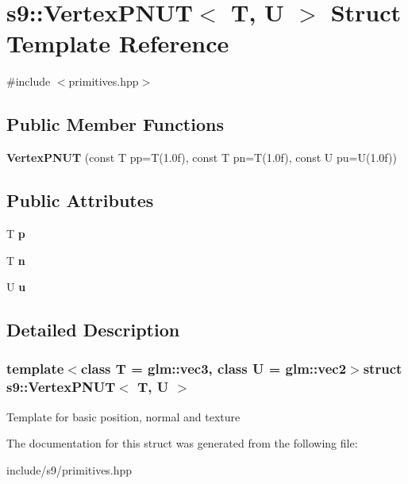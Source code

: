 \hypertarget{structs9_1_1VertexPNUT}{\section{s9\-:\-:\-Vertex\-P\-N\-U\-T$<$ \-T, \-U $>$ \-Struct \-Template \-Reference}
\label{structs9_1_1VertexPNUT}
}


{\ttfamily \#include $<$primitives.\-hpp$>$}

\subsection*{\-Public \-Member \-Functions}
\begin{DoxyCompactItemize}
\item 
\hypertarget{structs9_1_1VertexPNUT_ae31bedc31b1522090d92ffd21e715148}{{\bfseries \-Vertex\-P\-N\-U\-T} (const \-T pp=\-T(1.\-0f), const T pn=\-T(1.\-0f), const U pu=\-U(1.\-0f))}\label{structs9_1_1VertexPNUT_ae31bedc31b1522090d92ffd21e715148}

\end{DoxyCompactItemize}
\subsection*{\-Public \-Attributes}
\begin{DoxyCompactItemize}
\item 
\hypertarget{structs9_1_1VertexPNUT_a5b7dd3f6950903a2fa045047ccb213db}{\-T {\bfseries p}}\label{structs9_1_1VertexPNUT_a5b7dd3f6950903a2fa045047ccb213db}

\item 
\hypertarget{structs9_1_1VertexPNUT_a29dfcd01e62eb9f30647aef61c9eb0a3}{\-T {\bfseries n}}\label{structs9_1_1VertexPNUT_a29dfcd01e62eb9f30647aef61c9eb0a3}

\item 
\hypertarget{structs9_1_1VertexPNUT_ace59717fc9d5e33045fa56331a2cfe7a}{\-U {\bfseries u}}\label{structs9_1_1VertexPNUT_ace59717fc9d5e33045fa56331a2cfe7a}

\end{DoxyCompactItemize}


\subsection{\-Detailed \-Description}
\subsubsection*{template$<$class T = glm\-::vec3, class U = glm\-::vec2$>$struct s9\-::\-Vertex\-P\-N\-U\-T$<$ T, U $>$}

\-Template for basic position, normal and texture 

\-The documentation for this struct was generated from the following file\-:\begin{DoxyCompactItemize}
\item 
include/s9/primitives.\-hpp\end{DoxyCompactItemize}

